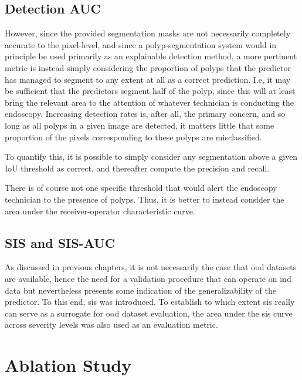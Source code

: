     \subsection{Detection AUC}
    However, since the provided segmentation masks are not necessarily completely accurate to the pixel-level, and since a polyp-segmentation system would in principle be used primarily as an explainable detection method, a  more pertinent metric is instead simply considering the proportion of polyps that the predictor has managed to segment to any extent at all as a correct prediction. I.e, it may be sufficient that the predictors segment half of the polyp, since this will at least bring the relevant area to the attention of whatever technician is conducting the endoscopy. Increasing detection rates is, after all, the primary concern, and so long as all polyps in a given image are detected, it matters little that some proportion of the pixels corresponding to these polyps are misclassified.
    
    To quantify this, it is possible to simply consider any segmentation above a given IoU threshold as correct, and thereafter compute the precision and recall. 
    
    
    There is of course not one specific threshold that would alert the endoscopy technician to the presence of polyps. Thus, it is better to instead consider the area under the receiver-operator characteristic curve.
    
    
    \subsection{SIS and SIS-AUC}
    As discussed in previous chapters, it is not necessarily the case that \gls{ood} datasets are available, hence the need for a validation procedure that can operate on \gls{ind} data but nevertheless presents some indication of the generalizability of the predictor. To this end, \gls{sis} was introduced. To establish to which extent \gls{sis} really can serve as a surrogate for \gls{ood} dataset evaluation, the area under the \gls{sis} curve across severity levels was also used as an evaluation metric.  
    
    \section{Ablation Study}
